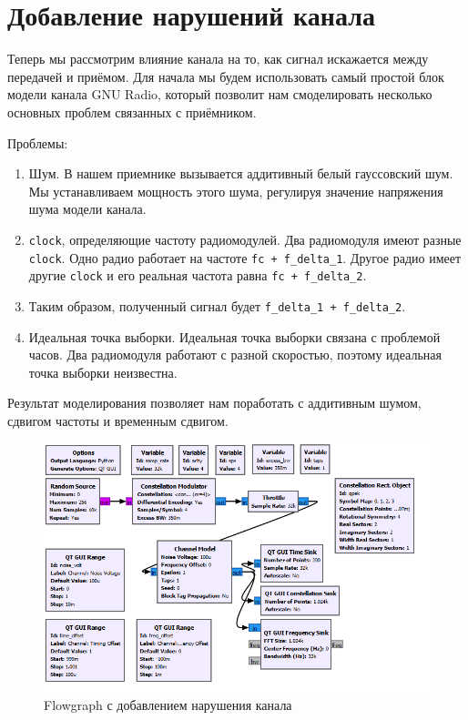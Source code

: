 \documentclass[a4paper, 14pt]{extarticle}
\begin{document}
    \newpage


    \section{Добавление нарушений канала}
    \label{sec:2}

    Теперь мы рассмотрим влияние канала на то, как сигнал искажается между передачей и приёмом.
    Для начала мы будем использовать самый простой блок модели канала GNU Radio, который позволит нам смоделировать несколько основных проблем связанных с приёмником.

    Проблемы:
    \begin{enumerate}
        \item Шум.
        В нашем приемнике вызывается аддитивный белый гауссовский шум. Мы устанавливаем мощность этого шума, регулируя значение напряжения шума модели канала.
        \item \texttt{clock}, определяющие частоту радиомодулей.
        Два радиомодуля имеют разные \texttt{clock}. Одно радио работает на частоте \texttt{fc + f\_delta\_1}.
        Другое радио имеет другие \texttt{clock} и его реальная частота равна \texttt{fc + f\_delta\_2}.
        \item Таким образом, полученный сигнал будет \texttt{f\_delta\_1 + f\_delta\_2}.
        \item Идеальная точка выборки.
        Идеальная точка выборки связана с проблемой часов.
        Два радиомодуля работают с разной скоростью, поэтому идеальная точка выборки неизвестна.
    \end{enumerate}

    Результат моделирования позволяет нам поработать с аддитивным шумом, сдвигом частоты и временным сдвигом.

    \begin{figure}[H]
        \centering
        \includegraphics[width=0.8\linewidth]{flowgraph_channel_impairments}
        \caption{Flowgraph с добавлением нарушения канала}
        \label{fig:flowgraph_channel_impairments}
    \end{figure}
\end{document}
